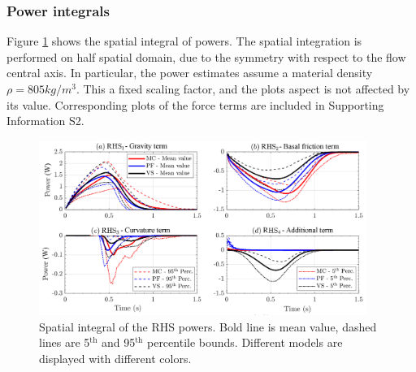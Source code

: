 \documentclass{article}
\begin{document}
\subsubsection{Power integrals}
Figure \ref{fig:Ramp-Power-spatial} shows the spatial integral of powers. The spatial integration is performed on half spatial domain, due to the symmetry with respect to the flow central axis. In particular, the power estimates assume a material density $\rho = 805 kg/m^3$. This a fixed scaling factor, and the plots aspect is not affected by its value. Corresponding plots of the force terms are included in Supporting Information S2.
\begin{figure}[H]
        \centering
        \includegraphics[width=0.95\textwidth]{InclinedPlane/AveragedMeasurments/PowersIncline.png}
        \caption{Spatial integral of the RHS powers. Bold line is mean value, dashed lines are 5$^{\mathrm{th}}$ and 95$^{\mathrm{th}}$ percentile bounds. Different models are displayed with different colors.}
        \label{fig:Ramp-Power-spatial}
\end{figure}
\end{document}
